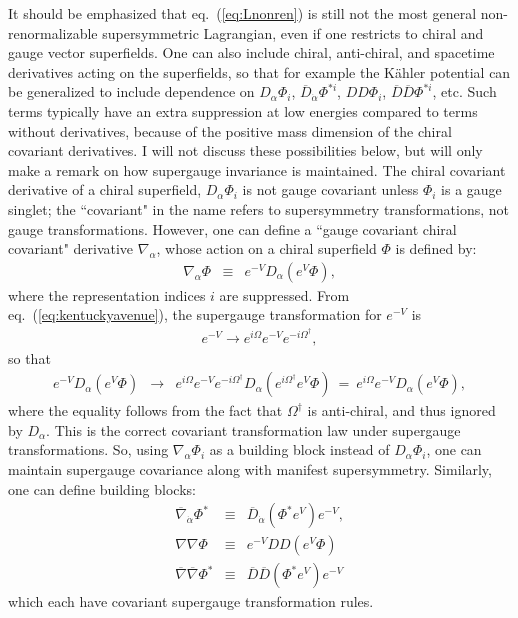 \documentclass[11pt]{article}
\def\beq{\begin{eqnarray}}
\def\eeq{\end{eqnarray}}
\def\Dcon{\overline D}
\begin{document}
It should be emphasized that eq.~(\ref{eq:Lnonren}) is still not the 
most general non-renormalizable supersymmetric Lagrangian, 
even if one restricts to chiral and 
gauge vector superfields. One can also include chiral, anti-chiral, and spacetime 
derivatives acting on the superfields, so that for example the K\"ahler potential
can be generalized to include dependence on $D_\alpha \Phi_i$, 
$\Dcon_{\dot\alpha} \Phi^{*i}$, $DD\Phi_i$, $\Dcon\Dcon\Phi^{*i}$, etc. 
Such terms typically have an extra suppression at low energies 
compared to terms without derivatives,
because of the positive mass dimension of the chiral covariant derivatives.
I will not discuss these possibilities below, but will only
make a remark on how supergauge invariance is maintained. 
The chiral covariant derivative of a chiral superfield, 
$D_\alpha \Phi_i$ is not gauge covariant unless $\Phi_i$ is a gauge singlet;
the ``covariant" in the name refers to supersymmetry transformations, not gauge
transformations. However, one can define
a ``gauge covariant chiral covariant" derivative $\nabla_\alpha$, 
whose action on a chiral superfield $\Phi$ is defined by:
\beq
\nabla_\alpha \Phi &\equiv&
e^{-V} D_\alpha (e^{V} \Phi) ,
\eeq
where the representation indices $i$ are suppressed.
From eq.~(\ref{eq:kentuckyavenue}), the supergauge transformation 
for $e^{-V}$ is
\beq
e^{-V} \rightarrow e^{i \Omega} e^{-V} e^{-i \Omega^\dagger},
\eeq
so that
\beq
e^{-V} D_\alpha (e^{V} \Phi) &\rightarrow&
e^{i \Omega} e^{-V} e^{-i \Omega^\dagger} D_\alpha (e^{i \Omega^\dagger} e^{V} \Phi)
\>=\> e^{i \Omega} e^{-V} D_\alpha (e^{V} \Phi),
\eeq
where the equality follows from the fact that $\Omega^\dagger$ is anti-chiral,
and thus ignored by $D_\alpha$. This is the correct covariant transformation law
under supergauge transformations.
So, using $\nabla_\alpha \Phi_i$ 
as a building block instead of $D_\alpha \Phi_i$, one can 
maintain supergauge covariance along with manifest supersymmetry.
Similarly, one can define building blocks:
\beq
\overline\nabla_{\dot\alpha} \Phi^* &\equiv& \Dcon_{\dot\alpha} (\Phi^*e^V ) e^{-V} 
,
\\
\nabla\nabla \Phi &\equiv& e^{-V} DD (e^V \Phi)
\\
\overline\nabla\overline\nabla \Phi^* &\equiv& \Dcon\Dcon (\Phi^*e^{V} ) e^{-V} 
\eeq
which each have covariant supergauge transformation rules.
 
\end{document}
